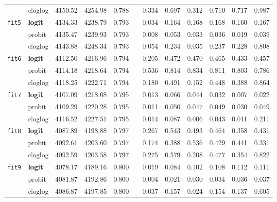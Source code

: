 \begin{tabular}{clcccccccccc}
       & cloglog            & 4150.52   & 4254.98   & 0.788   &   & 0.334   & 0.697   & 0.312   & 0.710   & 0.717   & 0.987   \\
\texttt{fit5}   & \textbf{logit}     & 4134.33   & 4238.79   & 0.793   &   & 0.034   & 0.164   & 0.168   & 0.168   & 0.160   & 0.167   \\
       & probit             & 4135.47   & 4239.93   & 0.793   &   & 0.008   & 0.053   & 0.033   & 0.036   & 0.019   & 0.039   \\
       & cloglog            & 4143.88   & 4248.34   & 0.793   &   & 0.054   & 0.234   & 0.035   & 0.237   & 0.228   & 0.808   \\
\texttt{fit6}   & \textbf{logit}     & 4112.50   & 4216.96   & 0.794   &   & 0.205   & 0.472   & 0.470   & 0.465   & 0.433   & 0.457   \\
       & probit             & 4114.18   & 4218.64   & 0.794   &   & 0.536   & 0.814   & 0.834   & 0.811   & 0.803   & 0.786   \\
       & cloglog            & 4118.25   & 4222.71   & 0.794   &   & 0.180   & 0.491   & 0.152   & 0.448   & 0.388   & 0.864   \\
\texttt{fit7}   & \textbf{logit}     & 4107.09   & 4218.08   & 0.795   &   & 0.013   & 0.066   & 0.044   & 0.032   & 0.007   & 0.022   \\
       & probit             & 4109.29   & 4220.28   & 0.795   &   & 0.011   & 0.050   & 0.047   & 0.049   & 0.030   & 0.049   \\
       & cloglog            & 4116.52   & 4227.51   & 0.795   &   & 0.014   & 0.087   & 0.006   & 0.043   & 0.011   & 0.211   \\
\texttt{fit8}   & \textbf{logit}     & 4087.89   & 4198.88   & 0.797   &   & 0.267   & 0.543   & 0.493   & 0.464   & 0.358   & 0.431   \\
       & probit             & 4092.61   & 4203.60   & 0.797   &   & 0.174   & 0.388   & 0.536   & 0.429   & 0.441   & 0.331   \\
       & cloglog            & 4092.59   & 4203.58   & 0.797   &   & 0.275   & 0.579   & 0.208   & 0.477   & 0.354   & 0.822   \\
\texttt{fit9}   & \textbf{logit}     & 4078.17   & 4189.16   & 0.800   &   & 0.019   & 0.084   & 0.102   & 0.108   & 0.112   & 0.111   \\
       & probit             & 4081.87   & 4192.86   & 0.800   &   & 0.004   & 0.021   & 0.030   & 0.034   & 0.036   & 0.037   \\
       & cloglog            & 4086.87   & 4197.85   & 0.800   &   & 0.037   & 0.157   & 0.024   & 0.154   & 0.137   & 0.605   \\

\end{tabular}
